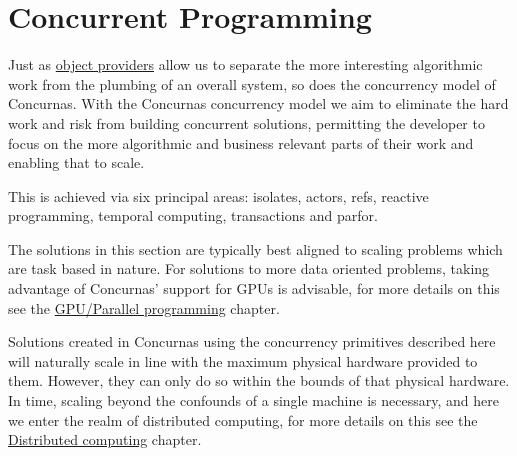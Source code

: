 \documentclass[conc-doc]{subfiles}
\begin{document}
	
	\chapter[Concurrent Programming]{Concurrent Programming}
		

Just as \hyperref[ch:ObjProviders]{object providers} allow us to separate the more interesting algorithmic work from the plumbing of an overall system, so does the concurrency model of Concurnas. With the Concurnas concurrency model we aim to eliminate the hard work and risk from building concurrent solutions, permitting the developer to focus on the more algorithmic and business relevant parts of their work and enabling that to scale.

This is achieved via six principal areas: isolates, actors, refs, reactive programming, temporal computing, transactions and parfor. 

The solutions in this section are typically best aligned to scaling problems which are task based in nature. For solutions to more data oriented problems, taking advantage of Concurnas' support for GPUs is advisable, for more details on this see the \hyperref[ch:gpuprogramming]{GPU/Parallel programming} chapter.

Solutions created in Concurnas using the concurrency primitives described here will naturally scale in line with the maximum physical hardware provided to them. However, they can only do so within the bounds of that physical hardware. In time, scaling beyond the confounds of a single machine is necessary, and here we enter the realm of distributed computing, for more details on this see the \hyperref[ch:distComp]{Distributed computing} chapter.
\end{document}

